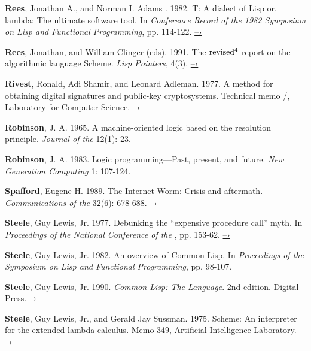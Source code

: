 { \label{Rees and Adams 1982}
\textbf{Rees}, Jonathan A., and Norman I. Adams . 1982.
T: A dialect of Lisp or,
lambda: The ultimate software tool.  In \textit{Conference Record of the 1982
 Symposium on Lisp and Functional Programming}, pp.  114-122.
\href{http://people.csail.mit.edu/riastradh/t/adams82t.pdf}{–›}

\textbf{Rees}, Jonathan, and William Clinger (eds). 1991.  The \(
\rm revised^4 \) report on the
algorithmic language Scheme.  \textit{Lisp Pointers}, 4(3).
\href{http://people.csail.mit.edu/jaffer/r4rs.pdf}{–›}

 \label{Rivest et al. (1977)}
\textbf{Rivest}, Ronald, Adi Shamir, and Leonard Adleman.  1977.  A
method for obtaining
digital signatures and public-key cryptosystems. Technical memo
/,
 Laboratory for Computer Science.
\href{http://people.csail.mit.edu/rivest/Rsapaper.pdf}{–›}

 \label{Robinson 1965}
\textbf{Robinson}, J. A. 1965. A machine-oriented logic based on the
resolution principle. \textit{Journal of the } 12(1): 23.

 \label{Robinson 1983}
\textbf{Robinson}, J. A. 1983.  Logic programming---Past, present, and future.
\textit{New Generation Computing} 1: 107-124.

 \label{Spafford 1989}
\textbf{Spafford}, Eugene H.  1989.  The Internet Worm: Crisis and aftermath.
\textit{Communications of the } 32(6): 678-688.
\href{http://citeseerx.ist.psu.edu/viewdoc/download?doi=10.1.1.123.8503&rep=rep1&type=pdf}{–›}

 \label{Steele 1977}
\textbf{Steele}, Guy Lewis, Jr.  1977.  Debunking the ``expensive
procedure call'' myth.
In \textit{Proceedings of the National Conference of the },
pp. 153-62.
\href{http://dspace.mit.edu/handle/1721.1/5753}{–›}

 \label{Steele 1982}
\textbf{Steele}, Guy Lewis, Jr.  1982.  An overview of Common Lisp.  In
\textit{Proceedings of the  Symposium on Lisp and Functional
Programming}, pp. 98-107.

 \label{Steele 1990}
\textbf{Steele}, Guy Lewis, Jr.  1990.  \textit{Common Lisp: The
Language}. 2nd edition.
Digital Press.
\href{http://www.cs.cmu.edu/Groups/AI/html/cltl/cltl2.html}{–›}

 \label{Steele and Sussman 1975}
\textbf{Steele}, Guy Lewis, Jr., and Gerald Jay Sussman.  1975.
Scheme: An interpreter
for the extended lambda calculus.  Memo 349,  Artificial
Intelligence Laboratory.
\href{http://dspace.mit.edu/handle/1721.1/5794}{–›}

}
